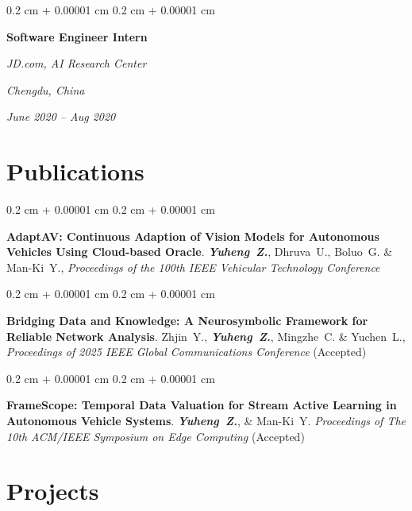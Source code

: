 \documentclass[10pt, letterpaper]{article}
\newenvironment{onecolentry}{
    \begin{adjustwidth}{
        0.2 cm + 0.00001 cm
    }{
        0.2 cm + 0.00001 cm
    }
}{
    \end{adjustwidth}
} %
\newenvironment{twocolentry}[2][]{
    \onecolentry
    \def\secondColumn{#2}
    \setcolumnwidth{\fill, 4.5 cm}
    \begin{paracol}{2}
}{
    \switchcolumn \raggedleft \secondColumn
    \end{paracol}
    \endonecolentry
} %
\begin{document}
        \begin{twocolentry}{
        \textit{Chengdu, China}    
            
        \textit{June 2020 – Aug 2020}}
            \textbf{Software Engineer Intern}
            
            \textit{JD.com, AI Research Center}
        \end{twocolentry}




    
    \section{Publications}



        
        \begin{samepage}
            \begin{onecolentry}
                \textbf{AdaptAV: Continuous Adaption of Vision Models for Autonomous Vehicles Using Cloud-based Oracle}. \mbox{\textbf{\textit{Yuheng Z.}}}, \mbox{Dhruva U.}, \mbox{Boluo G.} \& \mbox{Man-Ki Y.}, \textit{Proceedings of the 100th IEEE Vehicular Technology Conference}
            \end{onecolentry}
            \begin{onecolentry}
                \textbf{Bridging Data and Knowledge: A Neurosymbolic Framework for Reliable Network Analysis}. \mbox{Zhjin Y.}, \mbox{\textbf{\textit{Yuheng Z.}}}, \mbox{Mingzhe C.} \& \mbox{Yuchen L.}, \textit{Proceedings of 2025 IEEE Global Communications Conference} (Accepted)
            \end{onecolentry}
            \begin{onecolentry}
                \textbf{FrameScope: Temporal Data Valuation for Stream Active Learning in Autonomous Vehicle Systems}. \mbox{\textbf{\textit{Yuheng Z.}}}, \& \mbox{Man-Ki Y.} \textit{Proceedings of The 10th ACM/IEEE Symposium on Edge Computing} (Accepted)
            \end{onecolentry}


        \end{samepage}


    
    \section{Projects}
\end{document}
